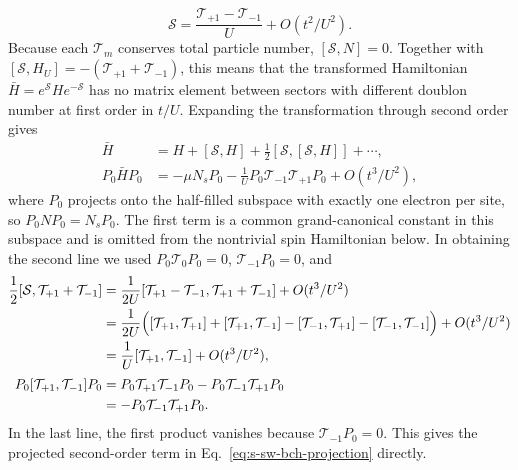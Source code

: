 \documentclass[10pt]{article}
\begin{document}
\begin{equation}
 \mathcal S=\frac{\mathcal T_{+1}-\mathcal T_{-1}}{U}
 +O(t^2/U^2).
\label{eq:s-sw-generator}
\end{equation}
Because each $\mathcal T_m$ conserves total particle number,
$[\mathcal S,N]=0$.  Together with
$[\mathcal S,H_U]=-(\mathcal T_{+1}+\mathcal T_{-1})$, this means that the transformed
Hamiltonian $\bar H=e^{\mathcal S}He^{-\mathcal S}$ has no matrix element
between sectors with different doublon number at first order in $t/U$.
Expanding the transformation through second order gives
\begin{equation}
\begin{aligned}
 \bar H
 &=H+[\mathcal S,H]+\frac12[\mathcal S,[\mathcal S,H]]+\cdots,\\
 P_0\bar H P_0
 &=-\mu N_sP_0
 -\frac1U P_0\mathcal T_{-1}\mathcal T_{+1}P_0
 +O(t^3/U^2),
\end{aligned}
\label{eq:s-sw-bch-projection}
\end{equation}
where $P_0$ projects onto the half-filled subspace with exactly one electron
per site, so $P_0NP_0=N_sP_0$.  The first term is a common grand-canonical
constant in this subspace and is omitted from the nontrivial spin Hamiltonian
below.  In obtaining the second line we used
$P_0\mathcal T_0P_0=0$, $\mathcal T_{-1}P_0=0$, and
\begin{equation}
\begin{aligned}
 \frac12[\mathcal S,\mathcal T_{+1}+\mathcal T_{-1}]
 &=\frac{1}{2U}
 [\mathcal T_{+1}-\mathcal T_{-1},
  \mathcal T_{+1}+\mathcal T_{-1}]
 +O(t^3/U^2)\\
 &=\frac{1}{2U}\Bigl(
 [\mathcal T_{+1},\mathcal T_{+1}]
 +[\mathcal T_{+1},\mathcal T_{-1}]
 -[\mathcal T_{-1},\mathcal T_{+1}]
 -[\mathcal T_{-1},\mathcal T_{-1}]\Bigr)
 +O(t^3/U^2)\\
 &=\frac1U[\mathcal T_{+1},\mathcal T_{-1}]
 +O(t^3/U^2),\\[2pt]
 P_0[\mathcal T_{+1},\mathcal T_{-1}]P_0
 &=P_0\mathcal T_{+1}\mathcal T_{-1}P_0
  -P_0\mathcal T_{-1}\mathcal T_{+1}P_0\\
 &=-P_0\mathcal T_{-1}\mathcal T_{+1}P_0.
\end{aligned}
\label{eq:s-sw-commutator}
\end{equation}
In the last line, the first product vanishes because
$\mathcal T_{-1}P_0=0$.  This gives the projected second-order term in
Eq.~\ref{eq:s-sw-bch-projection} directly.
\end{document}
